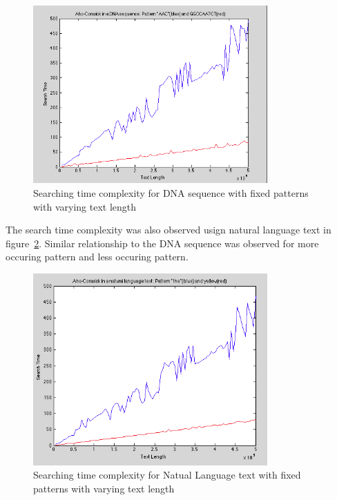 \documentclass[paper=a4, fontsize=11pt]{scrartcl} %
\numberwithin{equation}{section} %
\numberwithin{figure}{section} %
\numberwithin{table}{section} %
\begin{document}
\begin{figure}[h!]
\centering
\includegraphics[width=0.8\textwidth]{figures/ser-DNA-fixed-pattern.png}
\caption{Searching time complexity for DNA sequence with fixed patterns with varying text length}
\label{fig:ser-dna-pattern}
\end{figure}

The search time complexity was also observed usign natural language text in figure~\ref{fig:ser-natural-pattern}. Similar relationship to the DNA sequence was observed for more occuring pattern and less occuring pattern.

\begin{figure}[h!]
\centering
\includegraphics[width=0.8\textwidth]{figures/ser-Natural-fixed-pattern.png}
\caption{Searching time complexity for Natual Language text with fixed patterns with varying text length}
\label{fig:ser-natural-pattern}
\end{figure}

\newpage
\end{document}
